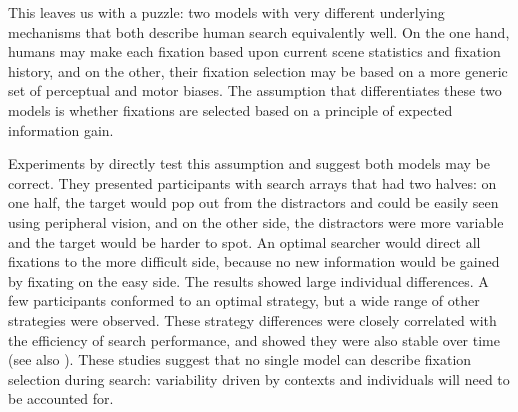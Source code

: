 \documentclass[vision,article,submit,moreauthors,pdftex,10pt,a4paper]{mdpi}
\begin{document}
This leaves us with a puzzle: two models with very different underlying mechanisms that both describe human search equivalently well. On the one hand, humans may make each fixation based upon current scene statistics and fixation history, and on the other, their fixation selection may be based on a more generic set of perceptual and motor biases. The assumption that differentiates these two models is whether fixations are selected based on a principle of expected information gain. 

Experiments by \citeauthor{nowakowska2017human} \cite{nowakowska2017human} directly test this assumption and suggest both models may be correct. They presented participants with search arrays that had two halves: on one half, the target would pop out from the distractors and could be easily seen using peripheral vision, and on the other side, the distractors were more variable and the target would be harder to spot. An optimal searcher would direct all fixations to the more difficult side, because no new information would be gained by fixating on the easy side. The results showed large individual differences. A few participants conformed to an optimal strategy, but a wide range of other strategies were observed. These strategy differences were closely correlated with the efficiency of search performance, and \citeauthor{clarke2018stable} \cite{clarke2018stable} showed they were also stable over time (see also \cite{nowakowska2019practice}). These studies suggest that no single model can describe fixation selection during search: variability driven by contexts and individuals will need to be accounted for.
\end{document}
